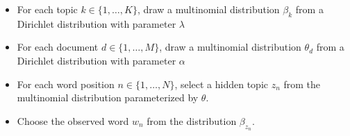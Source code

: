 \begin{frame}
\begin{center}
\end{center}

\begin{itemize}
\item<1-> For each topic $k \in \{1, \dots, K\}$, draw a multinomial distribution $\beta_k$ from a Dirichlet distribution with parameter $\lambda$
\item<2-> For each document $d \in \{1, \dots, M\}$, draw a multinomial distribution $\theta_d$ from a Dirichlet distribution with parameter $\alpha$
\item<3-> For each word position $n \in \{1, \dots, N\}$, select a hidden topic $z_n$ from the multinomial distribution parameterized by $\theta$.
\item<4-> Choose the observed word $w_n$ from the distribution $\beta_{z_n}$.
\end{itemize}

\end{frame}



\ifevaluation


